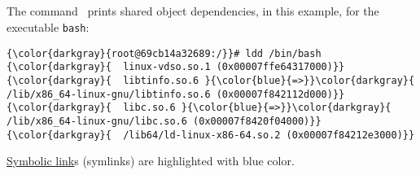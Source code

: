 % 

\subsection{\ldd}
\label{sec:ldd}
The command  \ prints shared object dependencies, in this example, for the executable \texttt{bash}:
{\footnotesize{
\begin{Verbatim}[commandchars=\\\{\}]
{\color{darkgray}{root@69cb14a32689:/}}# ldd /bin/bash
{\color{darkgray}{	linux-vdso.so.1 (0x00007ffe64317000)}}
{\color{darkgray}{	libtinfo.so.6 }{\color{blue}{=>}}\color{darkgray}{ /lib/x86_64-linux-gnu/libtinfo.so.6 (0x00007f842112d000)}}
{\color{darkgray}{	libc.so.6 }{\color{blue}{=>}}\color{darkgray}{ /lib/x86_64-linux-gnu/libc.so.6 (0x00007f8420f04000)}}
{\color{darkgray}{	/lib64/ld-linux-x86-64.so.2 (0x00007f84212e3000)}}
\end{Verbatim}
}}

\href{https://en.wikipedia.org/wiki/Symbolic_link}{Symbolic link}s (symlinks) are highlighted with blue color.

\endinput  %

